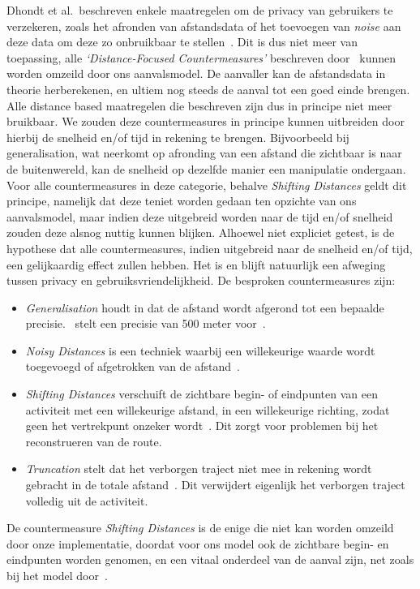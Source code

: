 Dhondt et al.\ beschreven enkele maatregelen om de privacy van gebruikers te
verzekeren, zoals het afronden van afstandsdata of het toevoegen van
\textit{noise} aan deze data om deze zo onbruikbaar te stellen~\cite{Dhondt}.
Dit is dus niet meer van toepassing, alle \textit{`Distance-Focused
      Countermeasures'} beschreven door~\citeauthor{Dhondt} kunnen worden omzeild
door ons aanvalsmodel. De aanvaller kan de afstandsdata in theorie
herberekenen, en ultiem nog steeds de aanval tot een goed einde brengen. Alle
distance based maatregelen die \citeauthor{Dhondt} beschreven zijn dus in
principe niet meer bruikbaar. We zouden deze countermeasures in principe kunnen
uitbreiden door hierbij de snelheid en/of tijd in rekening te brengen.
Bijvoorbeeld bij generalisation, wat neerkomt op afronding van een afstand die
zichtbaar is naar de buitenwereld, kan de snelheid op dezelfde manier een
manipulatie ondergaan. Voor alle countermeasures in deze categorie, behalve
\textit{Shifting Distances} geldt dit principe, namelijk dat deze teniet worden
gedaan ten opzichte van ons aanvalsmodel, maar indien deze uitgebreid worden
naar de tijd en/of snelheid zouden deze alsnog nuttig kunnen blijken. Alhoewel
niet expliciet getest, is de hypothese dat alle countermeasures, indien
uitgebreid naar de snelheid en/of tijd, een gelijkaardig effect zullen hebben.
Het is en blijft natuurlijk een afweging tussen privacy en
gebruiksvriendelijkheid. De besproken countermeasures zijn:
\begin{itemize}
      \item \textit{Generalisation} houdt in dat de afstand wordt afgerond tot een bepaalde
            precisie.~\citeauthor{Dhondt} stelt een precisie van 500 meter
            voor~\cite{Dhondt}.
      \item \textit{Noisy Distances} is een techniek waarbij een willekeurige waarde wordt
            toegevoegd of afgetrokken van de afstand~\cite{Dhondt}.
      \item \textit{Shifting Distances} verschuift de zichtbare begin- of eindpunten van een activiteit met een willekeurige afstand, in een willekeurige richting,
            zodat geen het vertrekpunt onzeker wordt~\cite{Dhondt}. Dit zorgt voor problemen bij het reconstrueren van de route.
      \item \textit{Truncation} stelt dat het verborgen traject niet mee in rekening wordt gebracht in de
            totale afstand~\cite{Dhondt}. Dit verwijdert eigenlijk het verborgen traject volledig uit de activiteit.
\end{itemize}
De countermeasure \textit{Shifting Distances} is de enige die niet kan worden
omzeild door onze implementatie, doordat voor ons model ook de
zichtbare begin- en eindpunten worden genomen, en een vitaal onderdeel van de
aanval zijn, net zoals bij het model door~\citeauthor{Dhondt}.

